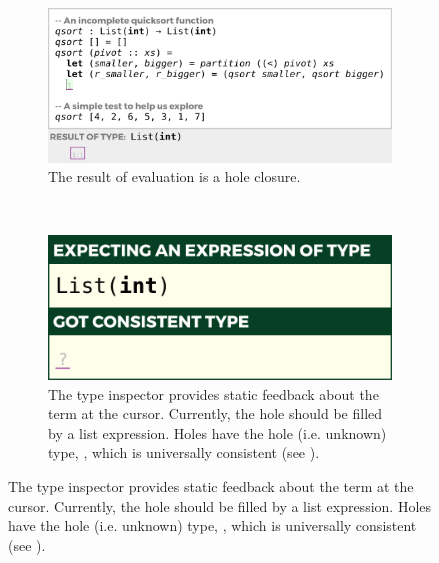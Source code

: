 
\begin{figure}[t]
\begin{subfigure}[t]{0.70\textwidth}
\centering
\includegraphics[width=\textwidth,interpolate=false,valign=t]{images/qsort-code.png}
\vspace{-3px}
\caption{The result of evaluation is a hole closure.}
\label{fig:qsort-example-code}
\end{subfigure}
~
\begin{subfigure}[t]{0.29\textwidth}
\centering
\includegraphics[width=\textwidth,interpolate=false,valign=t]{images/type-inspector.png}
\vspace{-3px}
\caption{The type inspector provides static feedback about the term at the cursor. Currently, the hole should be filled by a list expression. Holes have the hole (i.e. unknown) type, , which  is universally consistent (see \cite{popl-paper,Siek06a}).
}
\label{fig:qsort-type-inspector}
\end{subfigure}

\vspace{8px}


\end{figure}
